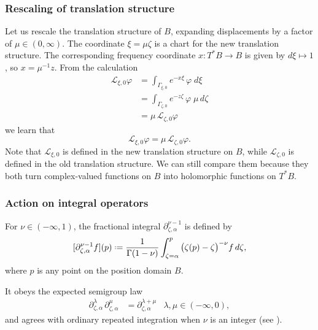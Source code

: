 \documentclass{article}
\theoremstyle{definition}
\newcommand{\maps}{\colon}
\newcommand{\fracderiv}[3]{\partial^{#1}_{#2, #3}}
\newcommand*{\defeq}{\mathrel{\vcenter{\baselineskip0.5ex \lineskiplimit0pt
                     \hbox{\scriptsize.}\hbox{\scriptsize.}}}%
                     =}
\newcommand{\laplace}{\mathcal{L}}
\theoremstyle{plain}
\begin{document}
\subsubsection{Rescaling of translation structure}
%
Let us rescale the translation structure of $B$, expanding displacements by a factor of $\mu \in (0, \infty)$. The coordinate $\xi = \mu\zeta$ is a chart for the new translation structure. The corresponding frequency coordinate $x \maps T^*B \to B$ is given by $d\xi \mapsto 1$, so $x = \mu^{-1} z$. From the calculation
\begin{align*}
\laplace_{\xi, 0} \varphi & = \int_{\Gamma_{\xi, 0}} e^{-x\xi}\,\varphi\;d\xi \\
& = \int_{\Gamma_{\zeta, 0}} e^{-z \zeta}\,\varphi\;\mu\,d\zeta \\
& = \mu\,\laplace_{\zeta, 0} \varphi
\end{align*}
we learn that
\[ \laplace_{\xi, 0} \varphi = \mu\,\laplace_{\zeta, 0} \varphi. \]
Note that $\laplace_{\xi, 0}$ is defined in the new translation structure on $B$, while $\laplace_{\zeta, 0}$ is defined in the old translation structure. We can still compare them because they both turn complex-valued functions on $B$ into holomorphic functions on $T^*B$.
%
\subsubsection{Action on integral operators}\label{L-int-op}
For $\nu \in (-\infty, 1)$, the fractional integral $\partial^{\nu-1}_{\zeta, \alpha}$ is defined by
\[ [\partial^{\nu-1}_{\zeta, \alpha} f](p) \defeq \frac{1}{\Gamma(1-\nu)} \int_{\zeta = \alpha}^p \big(\zeta(p)-\zeta\big)^{-\nu} f\,d\zeta, \]
where $p$ is any point on the position domain $B$. 

It obeys the expected semigroup law \cite[Section  1.3]{mladenov2014advanced}
\begin{align*}
\fracderiv{\lambda}{\zeta}{\alpha}\,\fracderiv{\mu}{\zeta}{\alpha} & = \fracderiv{\lambda+\mu}{\zeta}{\alpha} & \lambda, \mu \in (-\infty, 0),
\end{align*}
and agrees with ordinary repeated integration when $\nu$ is an integer (see \cite[Equation 35]{mladenov2014advanced}).
\end{document}
